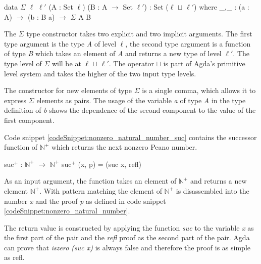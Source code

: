 \begin{codesnippet}[mathescape=true, caption={Definition of $\Sigma$ in Agda}, label={codeSnippet:sigma}]
data $\Sigma$ {$\ell$ $\ell '$} (A : Set $\ell$) (B : A $\rightarrow$ Set $\ell '$)
 : Set ($\ell$ $\sqcup$ $\ell '$) where
_,_ : (a : A) $\rightarrow$ (b : B a) $\rightarrow$ $\Sigma$ A B
\end{codesnippet}

The $\Sigma$ type constructor takes two explicit and two implicit arguments. 
The first type argument is the type \emph{A} of level $\ell$, the second type argument is a function of type \emph{B} which takes an element of \emph{A} and returns a new type of level $\ell '$.
The type level of $\Sigma$ will be at $\ell$ $\sqcup$ $\ell '$. The operator $\sqcup$ is part of Agda's primitive level system and takes the higher of the two input type levels.

The constructor for new elements of type $\Sigma$ is a single comma, which allows it to express $\Sigma$ elements as pairs.
The usage of the variable \emph{a} of type \emph{A} in the type definition of \emph{b} shows the dependence of the second component to the value of the first component.

Code snippet \ref{codeSnippet:nonzero_natural_number_suc} contains the successor function of $\mathbb{N}^+$ which returns the next nonzero Peano number.
\begin{codesnippet}[mathescape=true, caption={Successor of $\mathbb{N}^+$}, label={codeSnippet:nonzero_natural_number_suc}]
suc$^+$ : $\mathbb{N}^+$ $\rightarrow$ $\mathbb{N}^+$
suc$^+$ (x, p) = (suc x, refl)
\end{codesnippet}

As an input argument, the function takes an element of $\mathbb{N}^+$ and returns a new element $\mathbb{N}^+$. 
With pattern matching the element of $\mathbb{N}^+$ is disassembled into the number \emph{x} and the proof \emph{p} as defined in code snippet \ref{codeSnippet:nonzero_natural_number}.

The return value is constructed by applying the function \emph{suc} to the variable \emph{x} as the first part of the pair and the \emph{refl} proof as the second part of the pair.
Agda can prove that \emph{iszero (suc x)} is always false and therefore the proof is as simple as refl.